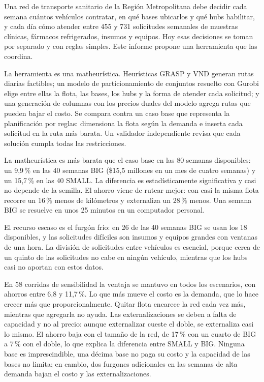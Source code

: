 Una red de transporte sanitario de la Región Metropolitana debe decidir cada semana cuántos vehículos contratar, en qué bases ubicarlos y qué hubs habilitar, y cada día cómo atender entre 455 y 731 solicitudes semanales de muestras clínicas, fármacos refrigerados, insumos y equipos. Hoy esas decisiones se toman por separado y con reglas simples. Este informe propone una herramienta que las coordina.

 La herramienta es una matheurística. Heurísticas GRASP y VND generan rutas diarias factibles; un modelo de particionamiento de conjuntos resuelto con Gurobi elige entre ellas la flota, las bases, los hubs y la forma de atender cada solicitud; y una generación de columnas con los precios duales del modelo agrega rutas que pueden bajar el costo. Se compara contra un caso base que representa la planificación por reglas: dimensiona la flota según la demanda e inserta cada solicitud en la ruta más barata. Un validador independiente revisa que cada solución cumpla todas las restricciones.

 La matheurística es más barata que el caso base en las 80 semanas disponibles: un 9,9\,\% en las 40 semanas BIG (\$15,5 millones en un mes de cuatro semanas) y un 15,7\,\% en las 40 SMALL. La diferencia es estadísticamente significativa y casi no depende de la semilla. El ahorro viene de rutear mejor: con casi la misma flota recorre un 16\,\% menos de kilómetros y externaliza un 28\,\% menos. Una semana BIG se resuelve en unos 25 minutos en un computador personal.

 El recurso escaso es el furgón frío: en 26 de las 40 semanas BIG se usan los 18 disponibles, y las solicitudes difíciles son insumos y equipos grandes con ventanas de una hora. La división de solicitudes entre vehículos es esencial, porque cerca de un quinto de las solicitudes no cabe en ningún vehículo, mientras que los hubs casi no aportan con estos datos.

 En 58 corridas de sensibilidad la ventaja se mantuvo en todos los escenarios, con ahorros entre 6,8 y 11,7\,\%. Lo que más mueve el costo es la demanda, que lo hace crecer más que proporcionalmente. Quitar flota encarece la red cada vez más, mientras que agregarla no ayuda. Las externalizaciones se deben a falta de capacidad y no al precio: aunque externalizar cueste el doble, se externaliza casi lo mismo. El ahorro baja con el tamaño de la red, de 17\,\% con un cuarto de BIG a 7\,\% con el doble, lo que explica la diferencia entre SMALL y BIG. Ninguna base es imprescindible, una décima base no paga su costo y la capacidad de las bases no limita; en cambio, dos furgones adicionales en las semanas de alta demanda bajan el costo y las externalizaciones.

